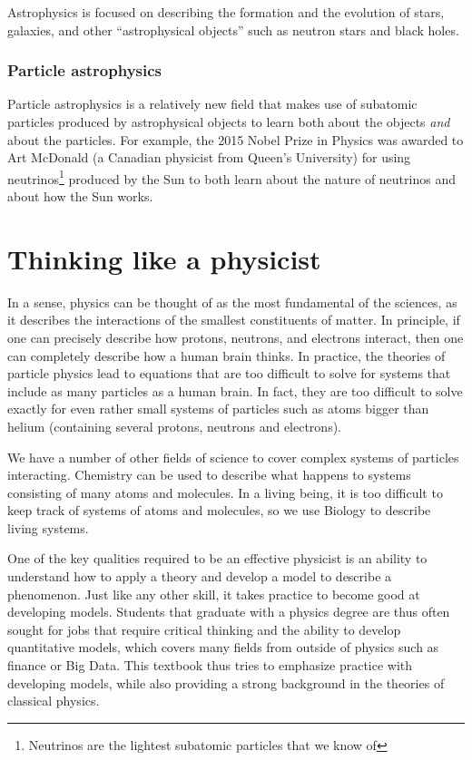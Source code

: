 Astrophysics is focused on describing the formation and the evolution of stars, galaxies, and other ``astrophysical objects'' such as neutron stars and black holes. 

\subsubsection{Particle astrophysics}
Particle astrophysics is a relatively new field that makes use of subatomic particles produced by astrophysical objects to learn both about the objects \textit{and} about the particles. For example, the 2015 Nobel Prize in Physics was awarded to Art McDonald (a Canadian physicist from Queen's University) for using neutrinos\footnote{Neutrinos are the lightest subatomic particles that we know of} produced by the Sun to both learn about the nature of neutrinos and about how the Sun works. 

\section{Thinking like a physicist}
In a sense, physics can be thought of as the most fundamental of the sciences, as it describes the interactions of the smallest constituents of matter. In principle, if one can precisely describe how protons, neutrons, and electrons interact, then one can completely describe how a human brain thinks. In practice, the theories of particle physics lead to equations that are too difficult to solve for systems that include as many particles as a human brain. In fact, they are too difficult to solve exactly for even rather small systems of particles such as atoms bigger than helium (containing several protons, neutrons and electrons). 

We have a number of other fields of science to cover complex systems of particles interacting. Chemistry can be used to describe what happens to systems consisting of many atoms and molecules. In a living being, it is too difficult to keep track of systems of atoms and molecules, so we use Biology to describe living systems. 

One of the key qualities required to be an effective physicist is an ability to understand how to apply a theory and develop a model to describe a phenomenon. Just like any other skill, it takes practice to become good at developing models. Students that graduate with a physics degree are thus often sought for jobs that require critical thinking and the ability to develop quantitative models, which covers many fields from outside of physics such as finance or Big Data. This textbook thus tries to emphasize practice with developing models, while also providing a strong background in the theories of classical physics. 

